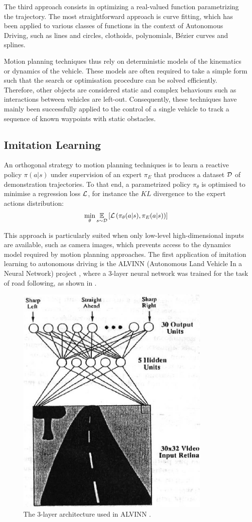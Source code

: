 The third approach consists in optimizing a real-valued function parametrizing the trajectory. The most straightforward approach is curve fitting, which has been applied to various classes of functions in the context of Autonomous Driving, such as lines and circles, clothoids, polynomials, Bézier curves and splines.

Motion planning techniques thus rely on deterministic models of the kinematics or dynamics of the vehicle. These models are often required to take a simple form such that the search or optimisation procedure can be solved efficiently. Therefore, other objects are considered static and complex behaviours such as interactions between vehicles are left-out. Consequently, these techniques have mainly been successfully applied to the control of a single vehicle to track a sequence of known waypoints with static obstacles.

\subsection{Imitation Learning}

An orthogonal strategy to motion planning techniques is to learn a reactive policy $\pi(a|s)$ under supervision of an expert $\pi_E$ that produces a dataset $\mathcal{D}$ of demonstration trajectories. To that end, a parametrized policy $\pi_\theta$ is optimised to minimise a regression loss $\mathcal{L}$, for instance the $KL$ divergence to the expert actions distribution:
\begin{equation*}
\min_\theta \operatorname*{\mathbb{E}}_{s\sim \mathcal{D}} \left[\mathcal{L}\left(\pi_{\theta}(a|s), \pi_E(a|s)\right)\right]
\end{equation*}

This approach is particularly suited when only low-level high-dimensional inputs are available, such as camera images, which prevents access to the dynamics model required by motion planning approaches. 
The first application of imitation learning to autonomous driving is the ALVINN (Autonomous Land Vehicle In a Neural Network) project \citep{Pomerleau89}, where a 3-layer neural network was trained for the task of road following, as shown in .

\begin{figure}[tp]
	\centering
	\includegraphics[width=0.4\linewidth]{img/alvinn}
	\caption{The 3-layer architecture used in ALVINN \citep{Pomerleau89}.}
	\label{fig:alvinn}
\end{figure}

